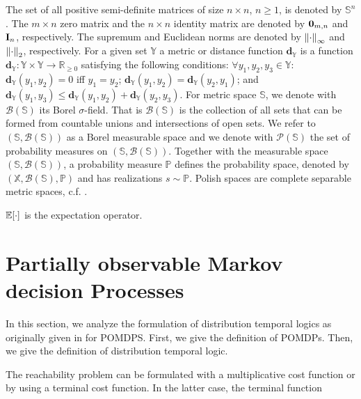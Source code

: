 \documentclass{ifacconf}
\newcommand{\X}{{\mathbb{X}}}
\newcommand{\Y}{{\mathbb{Y}}}
\newcommand{\po}{\mathbb{P}}     %
\renewcommand{\S}{\mathbb S}
\begin{document}
    
    The set of all positive semi-definite matrices of size
    $n \times n$, $n \geq 1$, is denoted by $\S^n$.    The $m \times n$ zero matrix and
    the $n \times n$ identity matrix are denoted by
    $\mathbf{0}_{m, n}$ and $\mathbf{I}_n$, respectively.
    The supremum and Euclidean norms are denoted by
    $\left\| {\cdot} \right\|_{\infty}$ and $\left\| {\cdot} \right\|_{2}$, respectively.
    For a given set $\Y$ a metric or distance function $\mathbf d_\Y$ is a function $\mathbf{d}_\Y: \Y\times \Y\rightarrow \mathbb R_{\ge 0}$ 
satisfying the following conditions: 
$\forall y_1,y_2,y_3\in\Y$:
$\mathbf d_\Y(y_1,y_2)=0$ iff $y_1=y_2$; 
$\mathbf d_\Y(y_1,y_2)=\mathbf d_{\Y}(y_2,y_1)$;  and
$\mathbf d_\Y(y_1,y_3)\leq \mathbf d_\Y(y_1,y_2) +\mathbf d_\Y(y_2,y_3)$. 
For metric space $\mathbb S$, we denote with  $\mathcal{B}(\mathbb S)$ its Borel $\sigma$-field. That is  $\mathcal{B}(\mathbb S)$ is the  
collection of all sets that can be formed from countable unions and intersections of open sets.
We refer to  $(\mathbb S,\mathcal{B}(\mathbb S))$ as a Borel measurable space and we denote with $\mathcal P(\mathbb S)$ the set of probability measures on $(\mathbb S,\mathcal{B}(\mathbb S))$.
Together with the measurable space $(\mathbb S,\mathcal{B}(\mathbb S))$,  a probability measure $\po$ defines the probability space, denoted by $(\X,\mathcal{B}(\mathbb S),\po)$ and has realizations  $s\sim \po$.   
Polish spaces are complete separable metric spaces, c.f. \cite{bogachev2007measure}. 

    $\mathbb{E}[\cdot]$ is the expectation operator.

    
    
\section{Partially observable Markov decision Processes}
In this section, we  analyze the formulation of distribution temporal logics as originally given in \cite{JonesDTL2013} for POMDPS. 
First, we give the definition of POMDPs. Then,  we  give the definition of distribution temporal logic. 


The reachability problem can be formulated with a multiplicative cost function or by using a terminal cost function. In the latter case, the terminal function 


 
\end{document}
